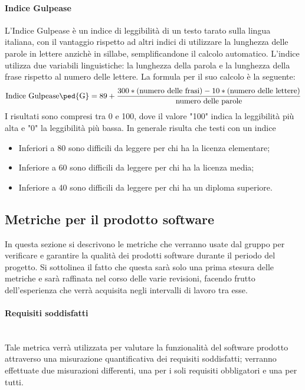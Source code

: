 \paragraph{Indice Gulpease}
L'{Indice Gulpease} è un indice di leggibilità di un testo tarato sulla lingua italiana, con il vantaggio rispetto ad altri indici di utilizzare la lunghezza delle parole in lettere anzichè in sillabe, semplificandone il calcolo automatico. L'indice utilizza due variabili linguistiche: la lunghezza della parola e la lunghezza della frase rispetto al numero delle lettere.
\newline La formula per il suo calcolo è la seguente:
\begin{displaymath}
\mbox{{Indice Gulpease}\ped{G}}= 89+\frac{300*\mbox{(numero delle frasi)}-10*\mbox{(numero delle lettere)}}{\mbox{numero delle parole}}
\end{displaymath}
I risultati sono compresi tra 0 e 100, dove il valore "100" indica la leggibilità più alta e "0" la leggibilità più bassa. In generale risulta che testi con un indice
\begin{itemize}
	\item Inferiori a 80 sono difficili da leggere per chi ha la licenza elementare;
	\item Inferiore a 60 sono difficili da leggere per chi ha la licenza media;
	\item Inferiore a 40 sono difficili da leggere per chi ha un diploma superiore.
\end{itemize}
\subsection{Metriche per il prodotto software}
\label{AppB:metricheProd}
In questa sezione si descrivono le metriche che verranno usate dal gruppo per verificare e garantire la qualità dei prodotti software durante il periodo del progetto. Si sottolinea il fatto che questa sarà solo una prima stesura delle metriche e sarà raffinata nel corso delle varie revisioni, facendo frutto dell'esperienza che verrà acquisita negli intervalli di lavoro tra esse.

\paragraph{Requisiti soddisfatti}
	~\\Tale metrica verrà utilizzata per valutare la funzionalità del software prodotto attraverso una misurazione quantificativa dei requisiti soddisfatti; verranno effettuate due misurazioni differenti, una per i soli requisiti obbligatori e una per tutti.

